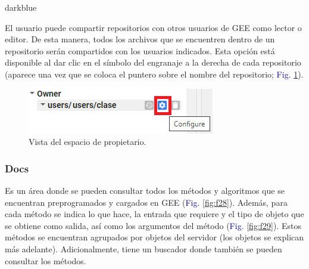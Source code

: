 \documentclass[
  12pt,
  letterpaper,
  twoside]{book}
\begin{document}
\begin{bluebox2}

\begin{awesomeblock}{5pt}{\faLightbulb}{darkblue}

El usuario puede compartir repositorios con otros usuarios de GEE como lector o editor. De esta manera, todos los archivos que se encuentren dentro de un repositorio serán compartidos con los usuarios indicados. Esta opción está disponible al dar clic en el símbolo del engranaje a la derecha de cada repositorio (aparece una vez que se coloca el puntero sobre el nombre del repositorio; \textcolor{darkblue}{Fig.} \ref{fig:f27}).

\begin{figure}[H]

{\centering \includegraphics[width=0.6\linewidth]{Img/engranaje} 

}

\caption{Vista del espacio de propietario.}\label{fig:f27}
\end{figure}

\end{awesomeblock}

\end{bluebox2}

\hypertarget{docs}{%
\subsubsection*{Docs}\label{docs}}

Es un área donde se pueden consultar todos los métodos y algoritmos que se encuentran preprogramados y cargados en GEE (\textcolor{darkblue}{Fig.} \ref{fig:f28}). Además, para cada método se indica lo que hace, la entrada que requiere y el tipo de objeto que se obtiene como salida, así como los argumentos del método (\textcolor{darkblue}{Fig.} \ref{fig:f29}). Estos métodos se encuentran agrupados por objetos del servidor (los objetos se explican más adelante). Adicionalmente, tiene un buscador donde también se pueden consultar los métodos.
\end{document}
